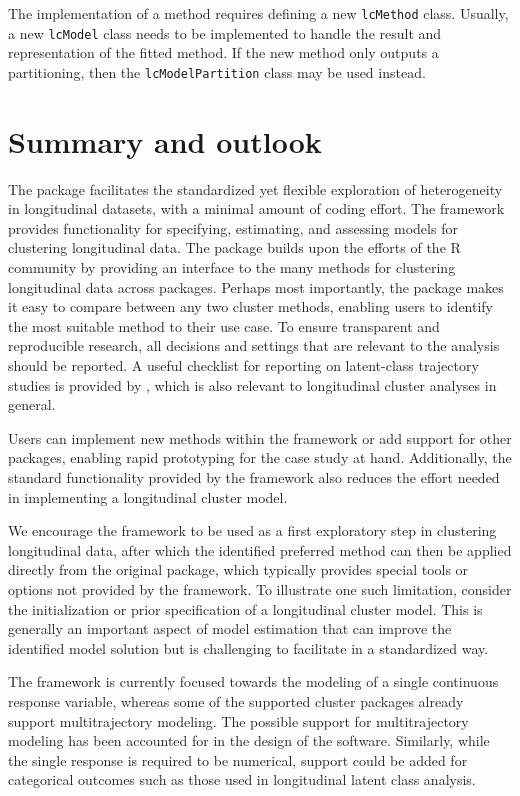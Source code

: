 The implementation of a method requires defining a new \texttt{lcMethod} class. Usually, a new \texttt{lcModel} class needs to be implemented to handle the result and representation of the fitted method. If the new method only outputs a partitioning, then the \texttt{lcModelPartition} class may be used instead.

\section{Summary and outlook}\label{sec:discussion}

The  package facilitates the standardized yet flexible exploration of heterogeneity in longitudinal datasets, with a minimal amount of coding effort. The framework provides functionality for specifying, estimating, and assessing models for clustering longitudinal data. The package builds upon the efforts of the R community by providing an interface to the many methods for clustering longitudinal data across packages. Perhaps most importantly, the  package makes it easy to compare between any two cluster methods, enabling users to identify the most suitable method to their use case. To ensure transparent and reproducible research, all decisions and settings that are relevant to the analysis should be reported. A useful checklist for reporting on latent-class trajectory studies is provided by \citet{van2017grolts}, which is also relevant to longitudinal cluster analyses in general.

Users can implement new methods within the framework or add support for other packages, enabling rapid prototyping for the case study at hand. Additionally, the standard functionality provided by the framework also reduces the effort needed in implementing a longitudinal cluster model.

We encourage the framework to be used as a first exploratory step in clustering longitudinal data, after which the identified preferred method can then be applied directly from the original package, which typically provides special tools or options not provided by the framework. To illustrate one such limitation, consider the initialization or prior specification of a longitudinal cluster model. This is generally an important aspect of model estimation that can improve the identified model solution but is challenging to facilitate in a standardized way.

The framework is currently focused towards the modeling of a single continuous response variable, whereas some of the supported cluster packages already support multitrajectory modeling. The possible support for multitrajectory modeling has been accounted for in the design of the software. Similarly, while the single response is required to be numerical, support could be added for categorical outcomes such as those used in longitudinal latent class analysis.

